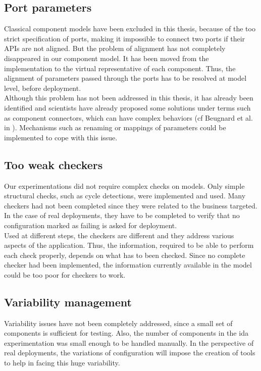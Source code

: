 \subsection{Port parameters}
Classical component models have been excluded in this thesis, because of the too strict specification of ports, making it impossible to connect two ports if their APIs are not aligned. But the problem of alignment has not completely disappeared in our component model. It has been moved from the implementation to the virtual representative of each component. Thus, the alignment of parameters passed through the ports has to be resolved at model level, before deployment.\\
Although this problem has not been addressed in this thesis, it has already been identified and scientists have already proposed some solutions under terms such as component connectors, which can have complex behaviors (cf Beugnard et al. in \cite{Matougui:2005}). Mechanisms such as renaming or mappings of parameters could be implemented to cope with this issue.

\subsection{Too weak checkers}

Our experimentations did not require complex checks on models. Only simple structural checks, such as cycle detections, were implemented and used. Many checkers had not been completed since they were related to the business targeted. In the case of real deployments, they have to be completed to verify that no configuration marked as failing is asked for deployment.\\
Used at different steps, the checkers are different and they address various aspects of the application. Thus, the information, required to be able to perform each check properly, depends on what has to been checked. Since no  complete checker had been implemented, the information currently available in the model could be too poor for checkers to work.

\subsection{Variability management}

Variability issues have not been completely addressed, since a small set of components is sufficient for testing. Also, the number of components in the \gls{ida} experimentation was small enough to be handled manually. In the perspective of real deployments, the variations of configuration will impose the creation of tools to help in facing this huge variability.

